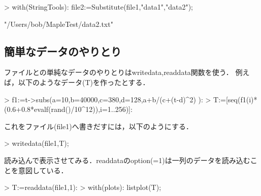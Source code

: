 \begin{MapleInput}
\begin{MapleInput}
> with(StringTools): file2:=Substitute(file1,"data1","data2");
\end{MapleInput}
\begin{MapleError}
                       "/Users/bob/MapleTest/data2.txt"
\end{MapleError}

\subsection{簡単なデータのやりとり}
ファイルとの単純なデータのやりとりはwritedata,readdata関数を使う．
例えば，以下のようなデータ(T)を作ったとする．
\begin{MapleInput}
> f1:=t->subs({a=10,b=40000,c=380,d=128},a+b/(c+(t-d)^2) ):
> T:=[seq(f1(i)*(0.6+0.8*evalf(rand()/10^12)),i=1..256)]:
\end{MapleInput}
これをファイル(file1)へ書きだすには，以下のようにする．
\begin{MapleInput}
> writedata(file1,T);
\end{MapleInput}
読み込んで表示させてみる．readdataのoption(=1)は一列のデータを読み込むことを意図している．
\begin{MapleInput}
> T:=readdata(file1,1): 
> with(plots): listplot(T);
\end{MapleInput}


\end{MapleInput}
